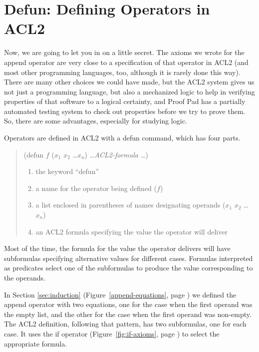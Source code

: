 \section{Defun: Defining Operators in ACL2}
\label{sec:defun}

Now, we are going to let you in on a little secret.
The axioms we wrote for the append operator are very
close to a specification of that operator in ACL2
(and most other programming languages, too, although
it is rarely done this way).
There are many other choices we could have made,
but the ACL2 system gives us not just a programming language,
but also a mechanized logic to help in verifying properties of
that software to a logical certainty,
and Proof Pad has a partially automated testing system to
check out properties before we try to prove them.
So, there are some advantages, especially for studying logic.

Operators are defined in ACL2 with a defun command,
which has four parts.
\begin{quote}
(defun $f$ ($x_1$ $x_2$ \dots $x_n$) \emph{\dots ACL2-formula \dots})

\begin{enumerate}
\item the keyword ``defun''
\item a name for the operator being defined ($f$)
\item a list enclosed in parentheses of names designating operands ($x_1$ $x_2$ \dots $x_n$)
\item an ACL2 formula specifying the value the operator will deliver
\end{enumerate}
\end{quote}

Most of the time, the formula for the value the operator delivers
will have subformulas specifying alternative values for different cases.
Formulas interpreted as predicates select one of
the subformulas to produce the value corresponding to the operands.

In Section \ref{sec:induction} (Figure~\ref{append-equations}, page \pageref{append-equations})
we defined the append operator with two equations,
one for the case when the first operand was the empty list,
and the other for the case when the first operand was non-empty.
The ACL2 definition, following that pattern, has two subformulas,
one for each case.
It uses the if operator
(Figure~\ref{fig:if-axioms}, page \pageref{fig:if-axioms})
to select the appropriate formula.

